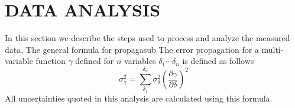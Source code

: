 \documentclass[aps,prstab,reprint,12pt]{revtex4-1}
\begin{document}





\section{DATA ANALYSIS}\label{s:discussion}

In this section we describe the steps used to process and analyze the measured data. The general formula for propagasub
The error propagation for a multi-variable function $\gamma$ defined for $n$ variables $\delta_1\cdots\delta_n$ is defined as follows
\begin{equation}
    \sigma_\gamma^2 = \sum_{\delta_1}^{\delta_n} \sigma_\delta^2 \left( \frac{\partial \gamma}{\partial \delta} \right)^2
\end{equation}
All uncertainties quoted in this analysis are calculated using this formula.
\end{document}
